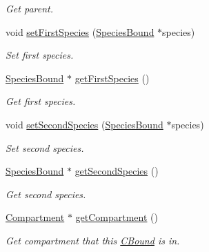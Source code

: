 \begin{DoxyCompactItemize}
\begin{DoxyCompactList}\small\item\em Get parent. \end{DoxyCompactList}\item 
void \hyperlink{classCBound_a17d4b84d683b0b7bd75b793410fed18f}{set\+First\+Species} (\hyperlink{classSpeciesBound}{Species\+Bound} $\ast$species)
\begin{DoxyCompactList}\small\item\em Set first species. \end{DoxyCompactList}\item 
\hyperlink{classSpeciesBound}{Species\+Bound} $\ast$ \hyperlink{classCBound_aad60656a671e4ffdc45b4c904fa7c320}{get\+First\+Species} ()
\begin{DoxyCompactList}\small\item\em Get first species. \end{DoxyCompactList}\item 
void \hyperlink{classCBound_a01badbb54867fb99b6f3a895d555867a}{set\+Second\+Species} (\hyperlink{classSpeciesBound}{Species\+Bound} $\ast$species)
\begin{DoxyCompactList}\small\item\em Set second species. \end{DoxyCompactList}\item 
\hyperlink{classSpeciesBound}{Species\+Bound} $\ast$ \hyperlink{classCBound_a1e706b6472c40ae1d98a64eda0acdadf}{get\+Second\+Species} ()
\begin{DoxyCompactList}\small\item\em Get second species. \end{DoxyCompactList}\item 
\hyperlink{classCompartment}{Compartment} $\ast$ \hyperlink{classCBound_a6c4d7b1b35d06725c8659424bf0c3f18}{get\+Compartment} ()
\begin{DoxyCompactList}\small\item\em Get compartment that this \hyperlink{classCBound}{C\+Bound} is in. \end{DoxyCompactList}\end{DoxyCompactItemize}
